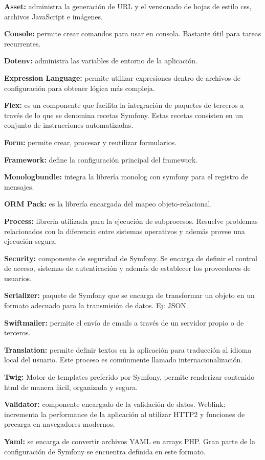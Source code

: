 \item \textbf{Asset:} administra la generación de URL y el versionado de hojas de estilo css, archivos JavaScript e imágenes.
\item \textbf{Console:} permite crear comandos para usar en consola. Bastante útil para tareas recurrentes.
\item \textbf{Dotenv:} administra las variables de entorno de la aplicación.
\item \textbf{Expression Language:} permite utilizar expresiones dentro de archivos de configuración para obtener lógica más compleja.
\item \textbf{Flex:} es un componente que facilita la integración de paquetes de terceros a través de lo que se denomina recetas Symfony. Estas recetas consisten en un conjunto de instrucciones automatizadas.
\item \textbf{Form:} permite crear, procesar y reutilizar formularios.
\item \textbf{Framework:} define la configuración principal del framework.
\item \textbf{Monologbundle:} integra la librería monolog con symfony para el registro de mensajes.
\item \textbf{ORM Pack:} es la librería encargada del mapeo objeto-relacional.
\item \textbf{Process:} librería utilizada para la ejecución de subprocesos. Resuelve problemas relacionados con la diferencia entre sistemas operativos y además provee una ejecución segura.
\item \textbf{Security:} componente de seguridad de Symfony. Se encarga de definir el control de acceso, sistemas de autenticación y además de establecer los proveedores de usuarios.
\item \textbf{Serializer:} paquete de Symfony que se encarga de transformar un objeto en un formato adecuado para la transmisión de datos. Ej: JSON.
\item \textbf{Swiftmailer:} permite el envío de emails a través de un servidor propio o de terceros.
\item \textbf{Translation:} permite definir textos en la aplicación para traducción al idioma local del usuario. Este proceso es comúnmente llamado internacionalización.
\item \textbf{Twig:} Motor de templates preferido por Symfony, permite renderizar contenido html de manera fácil, organizada y segura.
\item \textbf{Validator:} componente encargado de la validación de datos. Weblink: incrementa la performance de la aplicación al utilizar HTTP2 y funciones de precarga en navegadores modernos.
\item \textbf{Yaml:} se encarga de convertir archivos YAML en arrays PHP. Gran parte de la configuración de Symfony se encuentra definida en este formato.
